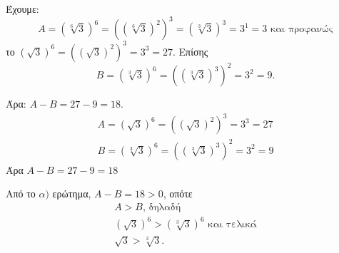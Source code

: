 
\begin{alist}
\item Έχουμε:
\[A = (\sqrt[6]{3})^6 = \left( (\sqrt[6]{3})^2 \right)^3 = \left( \sqrt[3]{3} \right)^3 = 3^1 = 3\text{ και προφανώς}\]
το $(\sqrt{3})^6 = ((\sqrt{3})^2)^3 = 3^3 = 27$.
Επίσης
\[B = (\sqrt[3]{3})^6 = ((\sqrt[3]{3})^3)^2 = 3^2 = 9.\]

Άρα: $A - B = 27 - 9 = 18$.
\begin{gather*}
A = (\sqrt{3})^6 = \left( (\sqrt{3})^2 \right)^3 = 3^3 = 27 \\
B = (\sqrt[3]{3})^6 = \left( (\sqrt[3]{3})^3 \right)^2 = 3^2 = 9
\end{gather*}
Άρα $A - B = 27 - 9 = 18$

\item Από το $\alpha)$ ερώτημα, $A - B = 18 > 0$, οπότε
\begin{gather*}
A > B\text{, δηλαδή} \\
(\sqrt{3})^6 > (\sqrt[3]{3})^6\text{ και τελικά} \\
\sqrt{3} > \sqrt[3]{3}.
\end{gather*}
\end{alist}

